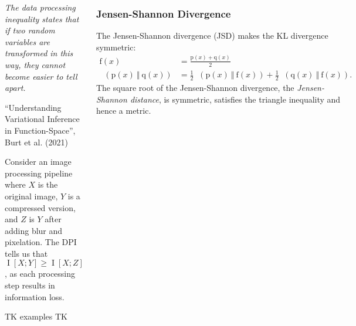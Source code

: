 \documentclass[25pt,a0paper,landscape]{tikzposter}
\begin{document}
\begin{columns}
{\begin{multicols}{2}
\columnbreak

\begin{tcolorbox}[drop fuzzy shadow southeast,enhanced,colback=brown!5!orange!40!white, colframe=brown!80!black, boxrule=1pt, left=5pt, right=5pt, top=5pt, bottom=5pt]
{\Large\emph{The data processing inequality states that if two random variables are transformed in this way, they cannot become easier to tell apart.}}
\begin{flushright}
``Understanding Variational Inference in Function-Space'', \\
Burt et al. (2021)
\end{flushright}
\end{tcolorbox}

\begin{tcolorbox}[colback=blue!5!white,colframe=blue!75!black,title=Example: Image Processing]
Consider an image processing pipeline where $X$ is the original image, $Y$ is a compressed version, and $Z$ is $Y$ after adding blur and pixelation. The DPI tells us that $\mathop{\mathrm{I}}[X;Y] \ge \mathop{\mathrm{I}}[X;Z]$, as each processing step results in information loss.
\end{tcolorbox}

TK examples TK

\end{multicols}

\begin{tcolorbox}[colback=green!5!white,colframe=teal!75!black,title=From KL to Jenson-Shannon Divergence to Mutual Information]

\begin{multicols}{2}
\subsubsection{Jensen-Shannon Divergence}

The Jensen-Shannon divergence (JSD) makes the KL divergence symmetric:
$$
\begin{aligned}
\mathrm{f}(x) &= \frac{\mathrm{p}(x) + \mathrm{q}(x)}{2}\\
\mathop{\mathrm{D_\mathrm{JSD}}}(\mathrm{p}(x) \:\Vert\: \mathrm{q}(x)) &= \frac{1}{2} \mathop{\mathrm{D_\mathrm{KL}}}(\mathrm{p}(x) \:\Vert\: \mathrm{f}(x)) + \frac{1}{2} \mathop{\mathrm{D_\mathrm{KL}}}(\mathrm{q}(x) \:\Vert\: \mathrm{f}(x)).
\end{aligned}
$$
The square root of the Jensen-Shannon divergence, the \emph{Jensen-Shannon distance}, is symmetric, satisfies the triangle inequality and hence a metric.


\end{multicols}
\end{tcolorbox}}
\end{columns}
\end{document}
